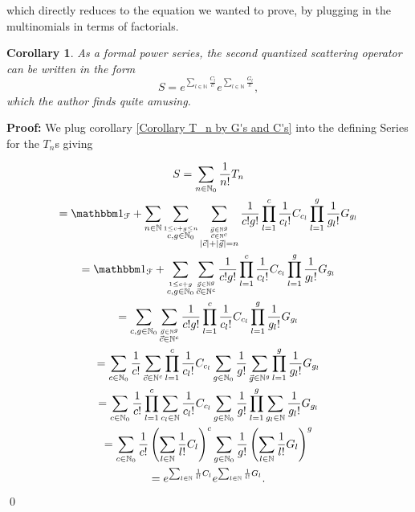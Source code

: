 \documentclass[b5paper,draft,openbib,12pt]{memoir}
\newtheorem{Corollary}[Def]{Corollary}
\newcommand{\id}{{\mathbbm 1}}
\begin{document}
which directly reduces to the equation we wanted to prove, by plugging in the multinomials in terms of
factorials. 

\begin{Corollary}
As a formal power series, the second quantized scattering operator can be written in the form
\begin{equation}\label{Corollary double exp}
S= e^{\sum_{l\in\mathbb{N}} \frac{C_{l}}{l!}}
 e^{\sum_{l\in\mathbb{N}} \frac{G_{l}}{l!}},
\end{equation}
which the author finds quite amusing.
\end{Corollary}
\textbf{Proof:} We plug corollary \ref{Corollary T_n by G's and C's} into the defining Series for the \(T_n\)s
giving

\begin{multline}
S= \sum_{n\in\mathbb{N}_0} \frac{1}{n!} T_n \\
=\id_{\mathcal{F}}+ \sum_{n\in\mathbb{N}} \sum_{\stackrel{1\le c+g\le n}{c,g\in\mathbb{N}_0}} 
\sum_{\stackrel{\stackrel{\vec{g}\in\mathbb{N}^g}{\vec{c}\in\mathbb{N}^c}}{|\vec{c}| + |\vec{g}|=n}} 
\frac{1}{c! g!} \prod_{l=1}^c \frac{1}{c_l!} C_{c_l} \prod_{l=1}^g \frac{1}{g_l!} G_{g_l}\\
=\id_{\mathcal{F}}+  \sum_{\stackrel{1\le c+g }{c,g\in\mathbb{N}_0}} 
\sum_{\stackrel{\vec{g}\in\mathbb{N}^g}{\vec{c}\in\mathbb{N}^c}} 
\frac{1}{c! g!} \prod_{l=1}^c \frac{1}{c_l!} C_{c_l} \prod_{l=1}^g \frac{1}{g_l!} G_{g_l}\\
=\sum_{c,g\in\mathbb{N}_0}
\sum_{\stackrel{\vec{g}\in\mathbb{N}^g}{\vec{c}\in\mathbb{N}^c}} 
\frac{1}{c! g!} \prod_{l=1}^c \frac{1}{c_l!} C_{c_l} \prod_{l=1}^g \frac{1}{g_l!} G_{g_l}\\
=\sum_{c\in\mathbb{N}_0} \frac{1}{c!} \sum_{\vec{c}\in\mathbb{N}^c} \prod_{l=1}^c \frac{1}{c_l!} C_{c_l}
\sum_{g\in\mathbb{N}_0} \frac{1}{g!} \sum_{\vec{g}\in\mathbb{N}^g} \prod_{l=1}^g \frac{1}{g_l!} G_{g_l}\\
=\sum_{c\in\mathbb{N}_0} \frac{1}{c!} \prod_{l=1}^c \sum_{c_l\in\mathbb{N}} \frac{1}{c_l!} C_{c_l}
\sum_{g\in\mathbb{N}_0} \frac{1}{g!}  \prod_{l=1}^g \sum_{g_l\in\mathbb{N}} \frac{1}{g_l!} G_{g_l}\\
=\sum_{c\in\mathbb{N}_0} \frac{1}{c!} \left( \sum_{l\in\mathbb{N}} \frac{1}{l!} C_{l}\right)^c
\sum_{g\in\mathbb{N}_0} \frac{1}{g!}  \left( \sum_{l\in\mathbb{N}} \frac{1}{l!} G_{l}\right)^g\\
=e^{\sum_{l\in\mathbb{N}} \frac{1}{l!} C_{l}} e^{\sum_{l\in\mathbb{N}} \frac{1}{l!} G_{l}}.
\end{multline}
\qed
\end{document}

